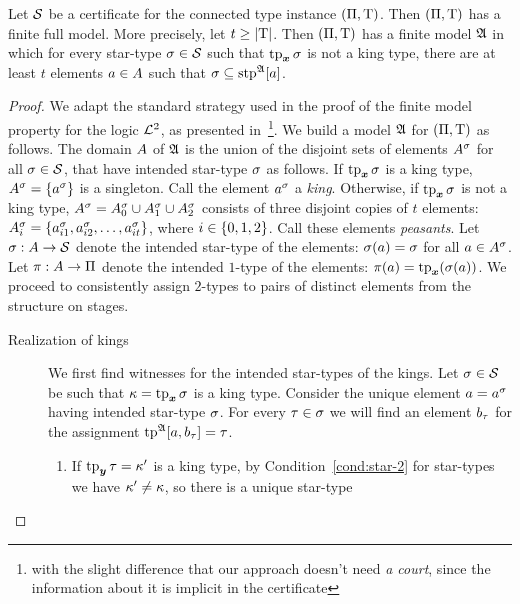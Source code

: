 \begin{lemma}\label{lem:cert-expand}
Let $\mathcal{S}$ be a certificate for the connected type instance $(\Pi,\mathrm{T})$.
Then $(\Pi,\mathrm{T})$ has a finite full model. More precisely, let $t \geq
\left|\mathrm{T}\right|$. Then $(\Pi,\mathrm{T})$ has a finite model $\mathfrak{A}$ in which for every
star-type $\sigma \in \mathcal{S}$ such that $\operatorname{tp}_{\bm{x}}\sigma$ is not a king type, there are
at least $t$ elements $a \in A$ such that $\sigma \subseteq
\operatorname{stp}^{\mathfrak{A}}[a]$.
\end{lemma}
\begin{proof}
We adapt the standard strategy used in the proof of the finite model property
for the logic $\mathcal{L}^{2}$, as presented in~\cite{gradel1999logics}\footnote{with
the slight difference that our approach doesn't need \emph{a court},
since the information about it is implicit in the certificate}.
We build a model $\mathfrak{A}$ for $(\Pi,\mathrm{T})$ as follows.
The domain $A$ of $\mathfrak{A}$ is the union of the disjoint sets of elements
$A^\sigma$ for all $\sigma \in \mathcal{S}$, that have intended star-type $\sigma$
as follows.
If $\operatorname{tp}_{\bm{x}}\sigma$ is a king type, $A^\sigma = \left\{a^\sigma\right\}$ is a
singleton. Call the element $a^\sigma$ a \emph{king}.
Otherwise, if $\operatorname{tp}_{\bm{x}}\sigma$ is not a king type, $A^\sigma = A^\sigma_0
\cup A^\sigma_1 \cup A^\sigma_2$ consists of three disjoint copies of $t$
elements:  $A^\sigma_i = \left\{a^\sigma_{i1}, a^\sigma_{i2}, \dots,
a^\sigma_{it}\right\}$, where $i \in \left\{0,1,2\right\}$. Call these elements
\emph{peasants}.
Let $\sigma : A \to \mathcal{S}$ denote the intended star-type of the elements:
$\sigma(a) = \sigma$ for all $a \in A^\sigma$.
Let $\pi : A \to \Pi$ denote the intended $1$-type of the elements:
$\pi(a) = \operatorname{tp}_{\bm{x}}(\sigma(a))$.
We proceed to consistently assign $2$-types to pairs of distinct elements from
the structure on stages.
\begin{description}
  \item[Realization of kings] We first find witnesses for the intended
  star-types of the kings.
  Let $\sigma \in \mathcal{S}$ be such that $\kappa = \operatorname{tp}_{\bm{x}}\sigma$ is a king type.
  Consider the unique element $a = a^\sigma$ having intended star-type
  $\sigma$.
  For every $\tau \in \sigma$ we will find an element $b_\tau$ for the
  assignment $\operatorname{tp}^{\mathfrak{A}}[a,b_\tau] = \tau$.
  \begin{enumerate}
  \item If $\operatorname{tp}_{\bm{y}}\tau = {\kappa'}$ is a king type, by Condition~\ref{cond:star-2}
  for star-types we have ${\kappa'} \neq \kappa$, so there is a unique star-type

\end{enumerate}
\end{description}
\end{proof}
